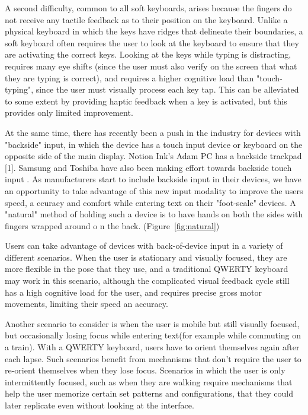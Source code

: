A second difficulty, common to all soft keyboards, arises because the
fingers do not receive any tactile feedback as to their position on
the keyboard.  Unlike a physical keyboard in which the keys have
ridges that delineate their boundaries, a soft keyboard often requires
the user to look at the keyboard to ensure that they are activating
the correct keys.  Looking at the keys while typing is distracting,
requires many eye shifts (since the user must also verify on the
screen that what they are typing is correct), and requires a higher
cognitive load than "touch-typing", since the user must visually
process each key tap.  This can be alleviated to some extent by
providing haptic feedback when a key is activated, but this provides
only limited improvement.

At the same time, there has recently been a push in the industry for
devices with "backside" input, in which the device has a touch input
device or keyboard on the opposite side of the main display. Notion
Ink's Adam PC has a backside trackpad [1]. Samsung and Toshiba have
also been making effort towards backside touch input
. As manufacturers start to include backside input in their devices, we have an opportunity to take advantage of this new input modality to improve the users speed, a
ccuracy and comfort while entering text on their "foot-scale" devices.  A "natural" method of holding such a device is to have hands on both the sides with fingers wrapped around o
n the back.
(Figure~\ref{fig:natural})

Users can take advantage of devices with back-of-device input in a variety
of different scenarios. When the user is stationary and visually
focused, they are more flexible in the pose that they use, and a
traditional QWERTY keyboard may work in this scenario, although the
complicated visual feedback cycle still has a high cognitive load for
the user, and requires precise gross motor movements, limiting their speed an accuracy. 

Another scenario to consider is when the user is mobile but still
visually focused, but occasionally losing focus while entering
text(for example while commuting on a train).  With a QWERTY keyboard,
users have to orient themselves again after each lapse. Such scenarios
benefit from mechanisms that don't require the user to re-orient
themselves when they lose focus.  Scenarios in which the user is only
intermittently focused, such as when they are walking require
mechanisms that help the user memorize certain set patterns and
configurations, that they could later replicate even without looking
at the interface. 

